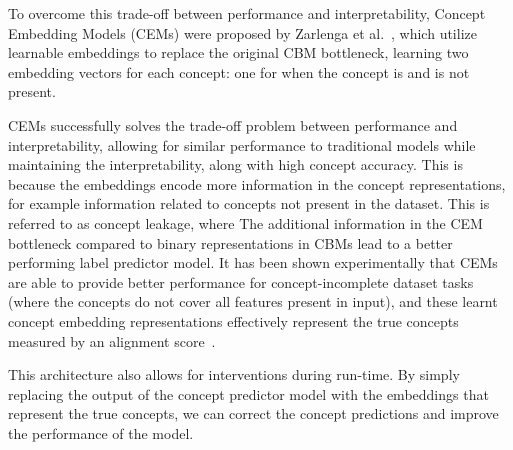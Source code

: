 To overcome this trade-off
between performance and interpretability, 
Concept Embedding Models (CEMs) were proposed by Zarlenga et al.~\cite{cem},
which utilize learnable embeddings to replace the original CBM bottleneck,
learning two embedding vectors for each concept: one for
when the concept is and is not present.

CEMs successfully solves the trade-off problem between performance and interpretability,
allowing for similar performance to traditional models while maintaining the
interpretability, along with high concept accuracy. This is because the embeddings
encode more information
in the concept representations, for example information
related to concepts not present in the dataset.
This is referred to as 
concept leakage, where
The additional information in the CEM bottleneck
 compared to binary representations in CBMs
lead to a better performing label predictor model.
 It has been shown experimentally
that CEMs are able to provide better performance for concept-incomplete dataset tasks (where
the concepts do not cover all features present in input), 
and these learnt concept
embedding representations effectively represent the true concepts measured by an alignment score~\cite{cem}.

This architecture also allows for interventions during run-time. By simply replacing
the output of the concept predictor model with the embeddings that represent
the true concepts, we can correct the concept predictions
 and improve the performance of the model. 


